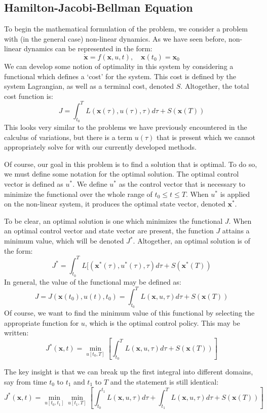 \subsection{Hamilton-Jacobi-Bellman Equation}
To begin the mathematical formulation of the problem, we consider a problem with (in the general case) non-linear dynamics. As we have seen before, non-linear dynamics can be represented in the form:
$$\dot{\bm{x}}=f(\bm{x},u,t),\quad \bm{x}(t_0)=\bm{x}_0$$
We can develop some notion of optimality in this system by considering a functional which defines a `cost' for the system. This cost is defined by the system \gls{Lagrangian}, as well as a terminal cost, denoted $S$. Altogether, the total cost function is:
$$J=\int_{t_0}^T{L(\bm{x}(\tau),u(\tau),\tau)d\tau}+S(\bm{x}(T))$$
This looks very similar to the problems we have previously encountered in the calculus of variations, but there is a term $u(\tau)$ that is present which we cannot appropriately solve for with our currently developed methods.

Of course, our goal in this problem is to find a solution that is optimal. To do so, we must define some notation for the optimal solution. 
The optimal control vector is defined as $u^*$. We define $u^*$ as the control vector that is necessary to minimize the functional over the whole range of $t_0\leq t\leq T$. When $u^*$ is applied on the non-linear system, it produces the optimal state vector, denoted $\bm{x}^*$.

To be clear, an optimal solution is one which minimizes the functional $J$. When an optimal control vector and state vector are present, the function $J$ attains a minimum value, which will be denoted $J^*$. Altogether, an optimal solution is of the form:
$$J^*=\int_{t_0}^T{L[(\bm{x}^*(\tau),u^*(\tau),\tau)d\tau}+S(\bm{x}^*(T))$$
In general, the value of the functional may be defined as:
$$J=J(\bm{x}(t_0),u(t),t_0)=
\int_{t_0}^T{L(\bm{x},u,\tau)d\tau}+S(\bm{x}(T))$$
Of course, we want to find the minimum value of this functional by selecting the appropriate function for $u$, which is the optimal control policy. This may be written:
$$J^*(\bm{x},t)=\min_{u[t_0,T]}\left[
\int_{t_0}^T{L(\bm{x},u,\tau)d\tau}+S(\bm{x}(T))\right]$$

The key insight is that we can break up the first integral into different domains, say from time $t_0$ to $t_1$ and $t_1$ to $T$ and the statement is still identical:
$$J^*(\bm{x},t)=\min_{u[t_0,t_1]}\min_{u[t_1,T]}\left[
\int_{t_0}^{t_1}{L(\bm{x},u,\tau)d\tau}+\int_{t_1}^{T}{L(\bm{x},u,\tau)d\tau}+S(\bm{x}(T))\right]$$

